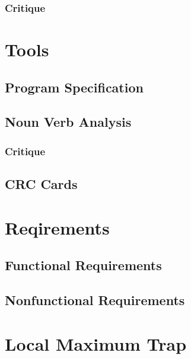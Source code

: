 \subsubsection{Critique}

\section{Tools}
\subsection{Program Specification}
\subsection{Noun Verb Analysis}
\subsubsection{Critique}


\subsection{CRC Cards}

\section{Reqirements}
\subsection{Functional Requirements}
\subsection{Nonfunctional Requirements}

\begin{inspiration}{\cite{love_guadec2005}}
\end{inspiration}

\section{Local Maximum Trap}


